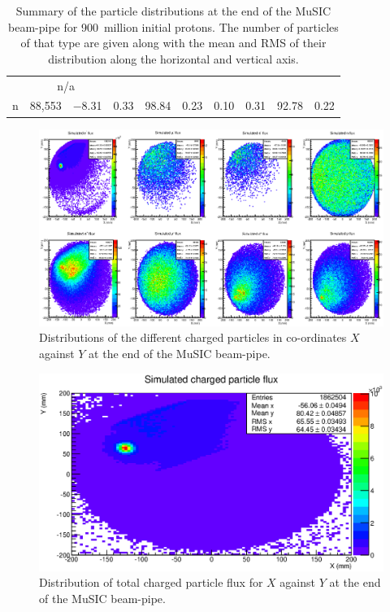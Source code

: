 \begin{table}[hptb]
\begin{center}
\begin{tabular}{c | r | r@{\(\pm\)}l | r@{\(\pm\)}l | r@{\(\pm\)}l | r@{\(\pm\)}l}
                                                                               &  \multicolumn{2}{c}{n/a}  \\
       n       &     88,553  &   \(-\)8.31 & 0.33  &  98.84 & 0.23  &        0.10 & 0.31  &  92.78 & 0.22  \\
  \end{tabular}
  \end{center}
  \caption{Summary of the particle distributions at the end of the MuSIC beam-pipe for 900~million initial protons. The number of particles of that type are given along with the mean and RMS of their distribution along the horizontal and vertical axis.}
  \label{tab:g4bl_particle_counts}
\end{table}

\begin{figure}
  \centering
    \includegraphics[width=.9\textwidth]{images/sim_2d_per_pid_flux.eps}
  \caption{Distributions of the different charged particles in co-ordinates \(X\) against \(Y\) at the end of the MuSIC beam-pipe.}
  \label{fig:images_sim_2d_per_pid_flux}
\end{figure}

\begin{figure}[hptb]
  \centering
  \includegraphics[width=.9\textwidth]{images/sim_2d_charged_particle_flux.eps}
  \caption{Distribution of total charged particle flux for \(X\) against \(Y\) at the end of the MuSIC beam-pipe.}
  \label{fig:images_sim_2d_charged_particle_flux}
\end{figure}


